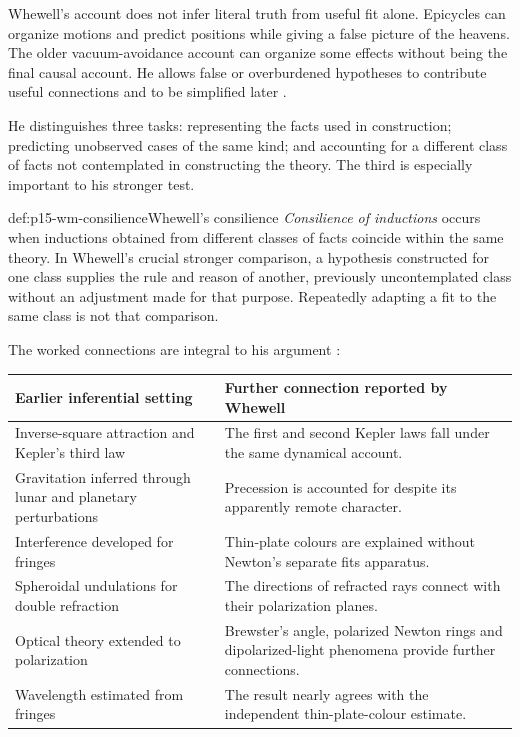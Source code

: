 Whewell's account does not infer literal truth from useful fit alone.
Epicycles can organize motions and predict positions while giving a false
picture of the heavens. The older vacuum-avoidance account can organize
some effects without being the final causal account.
He allows false or overburdened hypotheses to contribute useful
connections and to be simplified later
\parencite[II.V.6--10, pp.~78--87]{Whewell1858NovumPG}.

He distinguishes three tasks: representing the facts used in construction;
predicting unobserved cases of the same kind; and accounting for a
different class of facts not contemplated in constructing the theory.
The third is especially important to his stronger test.

\begin{hbdefinition}{def:p15-wm-consilience}{Whewell's consilience}
\emph{Consilience of inductions} occurs when inductions obtained from
different classes of facts coincide within the same theory.
In Whewell's crucial stronger comparison, a hypothesis constructed for
one class supplies the rule and reason of another, previously
uncontemplated class without an adjustment made for that purpose.
Repeatedly adapting a fit to the same class is not that comparison.
\end{hbdefinition}

The worked connections are integral to his argument
\parencite[II.V.10--11, pp.~85--90]{Whewell1858NovumPG}:

\begin{center}
\begin{tabular}{@{}p{.42\linewidth}p{.50\linewidth}@{}}
\toprule
Earlier inferential setting & Further connection reported by Whewell\\
\midrule
Inverse-square attraction and Kepler's third law &
The first and second Kepler laws fall under the same dynamical account.\\
Gravitation inferred through lunar and planetary perturbations &
Precession is accounted for despite its apparently remote character.\\
Interference developed for fringes &
Thin-plate colours are explained without Newton's separate fits apparatus.\\
Spheroidal undulations for double refraction &
The directions of refracted rays connect with their polarization planes.\\
Optical theory extended to polarization &
Brewster's angle, polarized Newton rings and dipolarized-light phenomena
provide further connections.\\
Wavelength estimated from fringes &
The result nearly agrees with the independent thin-plate-colour estimate.\\
\bottomrule
\end{tabular}
\end{center}

